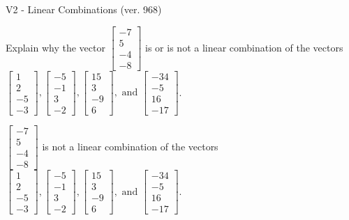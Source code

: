 \begin{exercise}
  \begin{exerciseTitle}V2 - Linear Combinations (ver. 968)\end{exerciseTitle}
  \begin{exerciseStatement}
    Explain why the vector \(\left[\begin{array}{c}
-7 \\
5 \\
-4 \\
-8
\end{array}\right]\)  is or is not a linear 
	combination of the vectors \(\left[\begin{array}{c}
1 \\
2 \\
-5 \\
-3
\end{array}\right] , \left[\begin{array}{c}
-5 \\
-1 \\
3 \\
-2
\end{array}\right] , \left[\begin{array}{c}
15 \\
3 \\
-9 \\
6
\end{array}\right] , \text{ and } \left[\begin{array}{c}
-34 \\
-5 \\
16 \\
-17
\end{array}\right]\).
	


  \end{exerciseStatement}
  \begin{exerciseAnswer}
   \(\left[\begin{array}{c}
-7 \\
5 \\
-4 \\
-8
\end{array}\right]\) 
  	 is not  
	a linear combination of the vectors \(\left[\begin{array}{c}
1 \\
2 \\
-5 \\
-3
\end{array}\right] , \left[\begin{array}{c}
-5 \\
-1 \\
3 \\
-2
\end{array}\right] , \left[\begin{array}{c}
15 \\
3 \\
-9 \\
6
\end{array}\right] , \text{ and } \left[\begin{array}{c}
-34 \\
-5 \\
16 \\
-17
\end{array}\right]\).


\end{exerciseAnswer}
\end{exercise}
